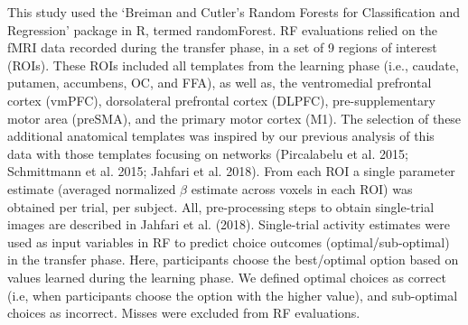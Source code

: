 \documentclass[]{article}
\begin{document}
This study used the `Breiman and Cutler's Random Forests for
Classification and Regression' package in R, termed randomForest. RF
evaluations relied on the fMRI data recorded during the transfer phase,
in a set of 9 regions of interest (ROIs). These ROIs included all
templates from the learning phase (i.e., caudate, putamen, accumbens,
OC, and FFA), as well as, the ventromedial prefrontal cortex (vmPFC),
dorsolateral prefrontal cortex (DLPFC), pre-supplementary motor area
(preSMA), and the primary motor cortex (M1). The selection of these
additional anatomical templates was inspired by our previous analysis of
this data with those templates focusing on networks (Pircalabelu et al.
2015; Schmittmann et al. 2015; Jahfari et al. 2018). From each ROI a
single parameter estimate (averaged normalized \(\beta\) estimate across
voxels in each ROI) was obtained per trial, per subject. All,
pre-processing steps to obtain single-trial images are described in
Jahfari et al. (2018). Single-trial activity estimates were used as
input variables in RF to predict choice outcomes (optimal/sub-optimal)
in the transfer phase. Here, participants choose the best/optimal option
based on values learned during the learning phase. We defined optimal
choices as correct (i.e, when participants choose the option with the
higher value), and sub-optimal choices as incorrect. Misses were
excluded from RF evaluations.
\end{document}
